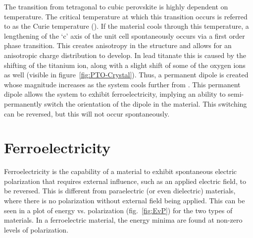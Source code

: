 The transition from tetragonal to cubic perovskite is highly dependent on temperature. The critical temperature at which this transition occurs is referred to as the Curie temperature (\Tc{}). If the material cools through this temperature, a lengthening of the `c' axis of the unit cell spontaneously occurs via a first order phase transition. This creates anisotropy in the structure and allows for an anisotropic charge distribution to develop. In lead titanate this is caused by the shifting of the titanium ion, along with a slight shift of some of the oxygen ions as well (visible in figure~\vref{fig:PTO-Crystal}). Thus, a permanent dipole is created whose magnitude increases as the system cools further from \Tc{}. This permanent dipole allows the system to exhibit ferroelectricity, implying an ability to semi-permanently switch the orientation of the dipole in the material. This switching can be reversed, but this will not occur spontaneously. 



\section{Ferroelectricity}
\label{sec:Materials-Ferro}

Ferroelectricity is the capability of a material to exhibit spontaneous electric polarization that requires external influence, such as an applied electric field, to be reversed. This is different from paraelectric (or even dielectric) materials, where there is no polarization without external field being applied. This can be seen in a plot of energy vs. polarization (fig.~\vref{fig:EvP}) for the two types of materials. In a ferroelectric material, the energy minima are found at non-zero levels of polarization. 

